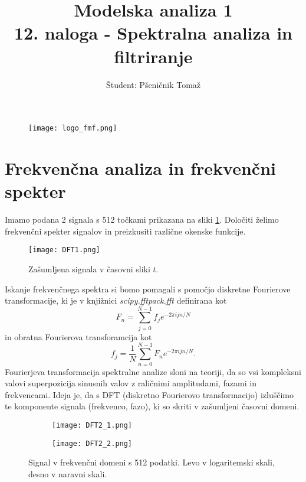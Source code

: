 \documentclass[12pt,a4paper]{article}
\title{\textbf{Modelska analiza 1} \\ 12. naloga - Spektralna analiza in filtriranje \\}
\author{Študent: Pšeničnik Tomaž}
\begin{document}

	\begin{figure} [h]
  \centering
  \texttt{[image: logo\_fmf.png]}
  \maketitle
\end{figure}
	
	
	
	\newpage
	
	
	
\section*{Frekvenčna analiza in frekvenčni spekter}

Imamo podana 2 signala s 512 točkami prikazana na sliki \ref{fig:slika1}. Določiti želimo frekvenčni spekter signalov in preizkusiti različne okenske funkcije.

\begin{figure}[H]
    \centering
        \texttt{[image: DFT1.png]}
    \caption{Zašumljena signala v časovni sliki $t$.} \label{fig:slika1}
\end{figure}

\noindent Iskanje frekvenčnega spektra si bomo pomagali s pomočjo diskretne Fourierove transformacije, ki je v knjižnici \textit{scipy.fftpack.fft} definirana kot
\begin{equation}
F_n = \sum _{j=0} ^{N-1} f_j e^{-2\pi i j n/N}  
\end{equation}
in obratna Fourierova transforamcija kot
\begin{equation}
f_j = \frac{1}{N} \sum _{n=0} ^{N-1} F_n e^{-2\pi i j n/N}.  
\end{equation}Fourierjeva transformacija spektralne analize sloni na teoriji, da so vsi kompleksni valovi superpozicija sinusnih valov z raličnimi amplitudami, fazami in frekvencami. Ideja je, da s DFT (diskretno Fourierovo transformacijo) izluščimo te komponente signala (frekvenco, fazo), ki so skriti v zašumljeni časovni domeni.


\begin{figure}[H]
    \centering
    \begin{subfigure}[b]{0.45\textwidth}
        \texttt{[image: DFT2\_1.png]}
    \end{subfigure}
    \begin{subfigure}[b]{0.45\textwidth}
        \texttt{[image: DFT2\_2.png]}
    \end{subfigure}
    \caption{Signal v frekvenčni domeni s 512 podatki. Levo v logaritemski skali, desno v naravni skali.} \label{fig:slika2}
\end{figure}
\end{document}
